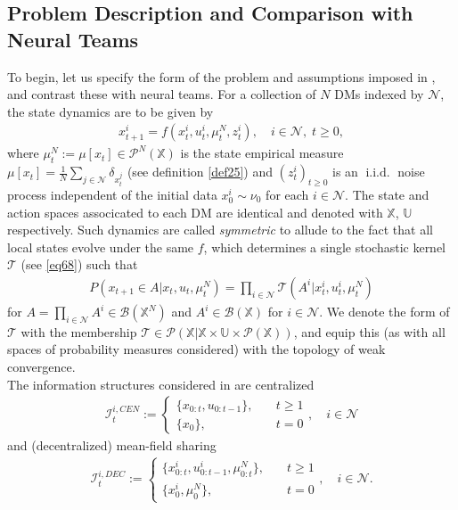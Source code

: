 \documentclass[12pt, oneside]{report}
\newcommand{\mbb}[1]{\mathbb{#1}}
\newcommand{\1}[1]{\mathbbm{1}_{\{#1\}}}
\newcommand{\mc}[1]{\mathcal{#1}}
\DeclareMathOperator{\iid}{i.i.d.}
\theoremstyle{definition}
\begin{document}
\subsection{Problem Description and Comparison with Neural Teams}\label{subsec1}
\indent To begin, let us specify the form of the problem and assumptions imposed
in \cite{Bauerle_2023}, \cite{Sanjari_Saldi_Yüksel_2024} and contrast these with
neural teams. For a collection of $N$ DMs indexed by $\mc{N}$, the state
dynamics are to be given by
\begin{align}
    x^i_{t+1}=f(x^i_t,u^i_t,\mu^N_t,z^i_t),\quad i\in\mc{N},\;t\geq 0,\label{eq75}
\end{align}
where $\mu^N_t:=\mu[x_t]\in\mc{P}^N(\mbb{X})$ is the state empirical measure
$\mu[x_t]=\frac{1}{N}\sum_{j\in\mc{N}}\delta_{x^j_t}$ (see definition
\ref{def25}) and $(z^i_t)_{t\geq 0}$ is an $\iid$ noise process independent of
the initial data $x^i_0\sim\nu_0$ for each $i\in\mc{N}$. The state and action
spaces associcated to each DM are identical and denoted with $\mbb{X}$,
$\mbb{U}$ respectively. Such dynamics are called
\textit{symmetric} to allude to the fact that all local states evolve under the
same $f$, which determines a single stochastic kernel $\mc{T}$ (see \ref{eq68})
such that
\begin{align}
   P(x_{t+1}\in A|x_t,u_t,\mu^N_t)=\prod_{i\in\mc{N}}\mc{T}(A^i|x^i_t,u^i_t,\mu^N_t)\label{eq80} 
\end{align}
for $A=\prod_{i\in\mc{N}}A^i\in\mc{B}(\mbb{X}^N)$ and $A^i\in\mc{B}(\mbb{X})$
for $i\in\mc{N}$. We denote the form of $\mc{T}$ with the membership
$\mc{T}\in\mc{P}(\mbb{X}|\mbb{X}\times\mbb{U}\times\mc{P}(\mbb{X}))$, and equip
this (as with all spaces of probability measures considered) with the topology
of weak convergence.\\[5pt]
\indent The information structures considered in
\cite{Sanjari_Saldi_Yüksel_2024} are centralized
\begin{align}
    \mc{I}^{i,CEN}_t:=\begin{cases}
        \{x_{0:t},u_{0:t-1}\},\quad&\text{$t\geq 1$}\\
        \{x_0\},\quad&\text{$t=0$}
    \end{cases},\quad i\in\mc{N}\label{eq69}
\end{align}
and (decentralized) mean-field sharing 
\begin{align}
    \mc{I}^{i,DEC}_t:=\begin{cases}
        \{x^i_{0:t},u^i_{0:t-1},\mu^N_{0:t}\},\quad&\text{$t\geq 1$}\\
        \{x^i_0,\mu^N_0\},\quad&\text{$t=0$}
    \end{cases},\quad i\in\mc{N}.\label{eq70}
\end{align}
\end{document}
